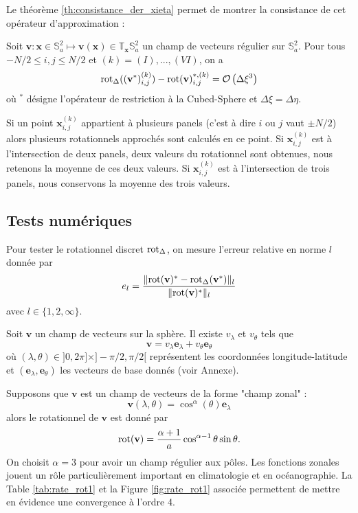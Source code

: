 Le théorème \ref{th:consistance_der_xieta} permet de montrer la consistance de cet opérateur d'approximation :

\begin{proposition}
Soit $\mathbf{v} : \mathbf{x} \in \mathbb{S}_a^2 \mapsto \mathbf{v}(\mathbf{x}) \in \mathbb{T}_{\mathbf{x}} \mathbb{S}_a^2$ un champ de vecteurs régulier sur $\mathbb{S}_a^2$. Pour tous $-N/2 \leq i,j \leq N/2$ et $(k) = (I), ..., (VI)$, on a
\begin{equation}
\text{rot}_{\Delta}((\mathbf{v}^*)_{i,j}^{(k)}) - \text{rot}(\mathbf{v})^{*,(k)}_{i,j} = \mathcal{O} \left( \Delta \xi^3  \right) 
\end{equation}
où $^*$ désigne l'opérateur de restriction à la Cubed-Sphere et $\Delta \xi = \Delta \eta$.
\end{proposition}

Si un point $\mathbf{x}_{i,j}^{(k)}$ appartient à plusieurs panels (c'est à dire $i$ ou $j$ vaut $\pm N/2$) alors plusieurs rotationnels approchés sont calculés en ce point. Si $\mathbf{x}_{i,j}^{(k)}$ est à l'intersection de deux panels, deux valeurs du rotationnel sont obtenues, nous retenons la moyenne de ces deux valeurs. Si $\mathbf{x}_{i,j}^{(k)}$ est à l'intersection de trois panels, nous conservons la moyenne des trois valeurs.

\subsection{Tests numériques}

Pour tester le rotationnel discret $\text{rot}_{\Delta}$, on mesure l'erreur relative en norme $l$ donnée par
\begin{equation}
e_l = \dfrac{\| \text{rot}(\mathbf{v})^* - \text{rot}_{\Delta}(\mathbf{v}^*) \|_l}{\| \text{rot}(\mathbf{v})^* \|_l}
\end{equation}
avec $l \in \lbrace 1, 2, \infty \rbrace$.

Soit $\mathbf{v}$ un champ de vecteurs sur la sphère. Il existe $v_{\lambda}$ et $v_{\theta}$ tels que 
\begin{equation}
\mathbf{v} = v_{\lambda} \mathbf{e}_{\lambda} + v_{\theta} \mathbf{e}_{\theta}
\end{equation} 
où $(\lambda,\theta) \in ]0,2\pi]\times ]-\pi/2, \pi/2[$ représentent les coordonnées longitude-latitude et $(\mathbf{e}_{\lambda}, \mathbf{e}_{\theta})$ les vecteurs de base donnés (voir Annexe).

Supposons que $\mathbf{v}$ est un champ de vecteurs de la forme "champ zonal" :
\begin{equation}
\mathbf{v}(\lambda, \theta) = \cos^{\alpha}(\theta) \mathbf{e}_{\lambda}
\label{eq:rot_test1}
\end{equation}
alors le rotationnel de $\mathbf{v}$ est donné par
\begin{equation}
\text{rot}(\mathbf{v}) = \dfrac{\alpha+1}{a} \cos^{\alpha-1} \theta \sin \theta .
\end{equation}
On choisit $\alpha = 3$ pour avoir un champ régulier aux pôles. Les fonctions zonales jouent un rôle particulièrement important en climatologie et en océanographie. La Table \ref{tab:rate_rot1} et la Figure \ref{fig:rate_rot1} associée permettent de mettre en évidence une convergence à l'ordre 4.


